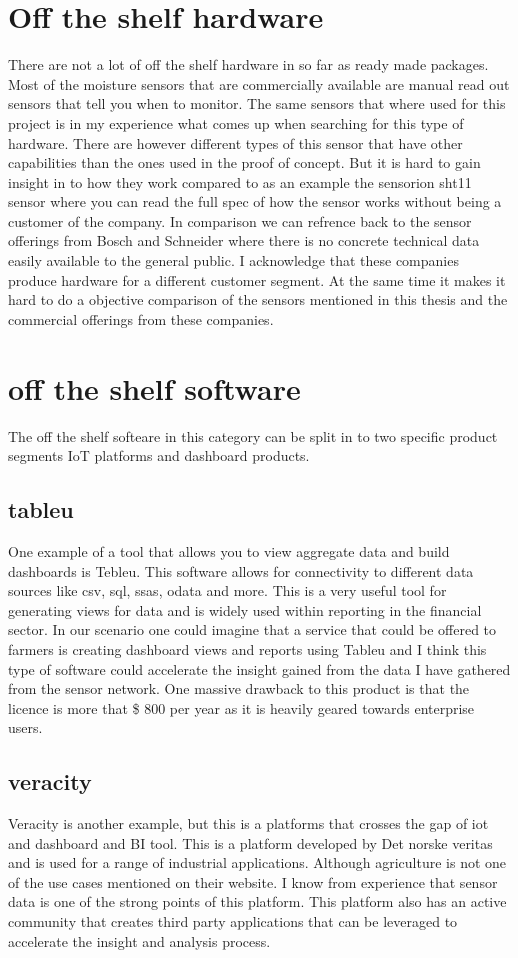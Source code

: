 \documentclass[]{uiophd}
\begin{document}
\section{Off the shelf hardware}
There are not a lot of off the shelf hardware in so far as ready made packages. Most of the moisture sensors that are commercially available are manual read out sensors that tell you when to monitor. The same sensors that where used for this project is in my experience what comes up when searching for this type of hardware. There are however different types of this sensor that have other capabilities than the ones used in the proof of concept. But it is hard to gain insight in to how they work compared to as an example the sensorion sht11 sensor where you can read the full spec of how the sensor works without being a customer of the company. In comparison we can refrence back to the sensor offerings from Bosch and Schneider where there is no concrete technical data easily available to the general public. I acknowledge that these companies produce hardware for a different customer segment. At the same time it makes it hard to do a objective comparison of the sensors mentioned in this thesis and the commercial offerings from these companies.

\section{off the shelf software}
The off the shelf softeare in this category can be split in to two specific product segments IoT platforms and dashboard products.

\subsection{tableu}
One example of a tool that allows you to view aggregate data and build dashboards is Tebleu. This software allows for connectivity to different data sources like csv, sql, ssas, odata and more. This is a very useful tool for generating views for data and is widely used within reporting in the financial sector. In our scenario one could imagine that a service that could be offered to farmers is creating dashboard views and reports using Tableu and I think this type of software could accelerate the insight gained from the data I have gathered from the sensor network. One massive drawback to this product is that the licence is more that \$ 800 per year as it is heavily geared towards enterprise users.

\subsection{veracity}
Veracity is another example, but this is a platforms that crosses the gap of iot and dashboard and BI tool. This is a platform developed by Det norske veritas and is used for a range of industrial applications. Although agriculture is not one of the use cases mentioned on their website. I know from experience that sensor data is one of the strong points of this platform. This platform also has an active community that creates third party applications that can be leveraged to accelerate the insight and analysis process. 
\end{document}
